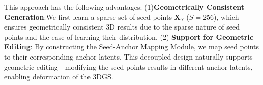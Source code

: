 This approach has the following advantages: (1)\textbf{Geometrically Consistent Generation}:We first learn a sparse set of seed points \( \mathbf{X}_\mathcal{S} \) (\( S = 256 \)), which ensures geometrically consistent 3D results due to the sparse nature of seed points and the ease of learning their distribution. (2) \textbf{Support for Geometric Editing}: By constructing the Seed-Anchor Mapping Module, we map seed points to their corresponding anchor latents. This decoupled design naturally supports geometric editing—modifying the seed points results in different anchor latents, enabling deformation of the 3DGS. 


 





